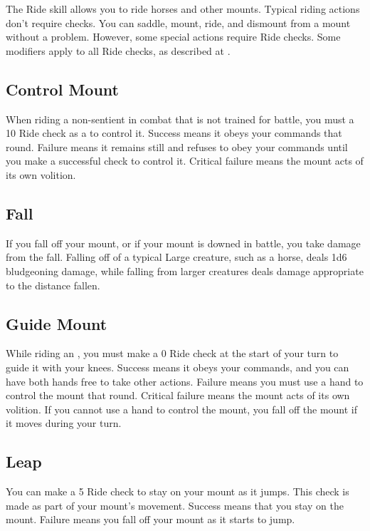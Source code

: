 \newpage
{}
        The Ride skill allows you to ride horses and other mounts. Typical riding actions don't require checks. You can saddle, mount, ride, and dismount from a mount without a problem. However, some special actions require Ride checks. Some modifiers apply to all Ride checks, as described at .

    \subsection{Control Mount}
        When riding a non-sentient  in combat that is not trained for battle, you must a  10 Ride check as a  to control it. Success means it obeys your commands that round. Failure means it remains still and refuses to obey your commands until you make a successful check to control it. Critical failure means the mount acts of its own volition.

    \subsection{Fall}
        If you fall off your mount, or if your mount is downed in battle, you take damage from the fall.
        Falling off of a typical Large creature, such as a horse, deals 1d6 bludgeoning damage, while falling from larger creatures deals damage appropriate to the distance fallen.

    \subsection{Guide Mount}
        While riding an , you must make a  0 Ride check at the start of your turn to guide it with your knees. Success means it obeys your commands, and you can have both hands free to take other actions. Failure means you must use a hand to control the mount that round. Critical failure means the mount acts of its own volition. If you cannot use a hand to control the mount, you fall off the mount if it moves during your turn.

    \subsection{Leap}
        You can make a  5 Ride check to stay on your mount as it jumps. This check is made as part of your mount's movement. Success means that you stay on the mount. Failure means you fall off your mount as it starts to jump.


